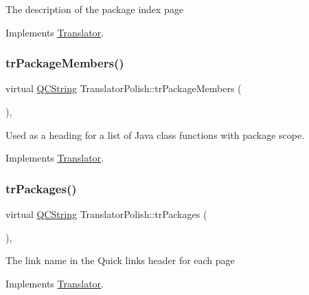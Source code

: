 The description of the package index page 

Implements \mbox{\hyperlink{class_translator}{Translator}}.

\mbox{\label{class_translator_polish_a7d1f6166319d89187e41c0173765e4fe}} 
\subsubsection{\texorpdfstring{trPackageMembers()}{trPackageMembers()}}
{\footnotesize\ttfamily virtual \mbox{\hyperlink{class_q_c_string}{Q\+C\+String}} Translator\+Polish\+::tr\+Package\+Members (\begin{DoxyParamCaption}{ }\end{DoxyParamCaption})\hspace{0.3cm}{\ttfamily [inline]}, {\ttfamily [virtual]}}

Used as a heading for a list of Java class functions with package scope. 

Implements \mbox{\hyperlink{class_translator}{Translator}}.

\mbox{\label{class_translator_polish_ace2118b22aaf21ebe135338d8b2b0b5e}} 
\subsubsection{\texorpdfstring{trPackages()}{trPackages()}}
{\footnotesize\ttfamily virtual \mbox{\hyperlink{class_q_c_string}{Q\+C\+String}} Translator\+Polish\+::tr\+Packages (\begin{DoxyParamCaption}{ }\end{DoxyParamCaption})\hspace{0.3cm}{\ttfamily [inline]}, {\ttfamily [virtual]}}

The link name in the Quick links header for each page 

Implements \mbox{\hyperlink{class_translator}{Translator}}.

\mbox{\label{class_translator_polish_aa9362c48b5a6b3c16a587a46757998a9}} 
